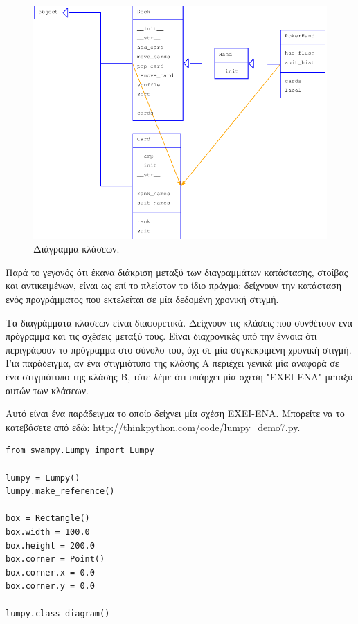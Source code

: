 \documentclass[10pt]{book}
\begin{document}
\begin{figure}
\centerline
{\includegraphics[scale=0.7]{figs/lumpydemo8.pdf}}
\caption{Διάγραμμα κλάσεων.}
\label{fig.lumpy8}
\end{figure}

Παρά το γεγονός ότι έκανα διάκριση μεταξύ των διαγραμμάτων κατάστασης, στοίβας και αντικειμένων, είναι
ως επί το πλείστον το ίδιο πράγμα: δείχνουν την κατάσταση ενός προγράμματος που εκτελείται σε μία δεδομένη
χρονική στιγμή.

Τα διαγράμματα κλάσεων είναι διαφορετικά.  Δείχνουν τις κλάσεις που συνθέτουν ένα πρόγραμμα και τις σχέσεις
μεταξύ τους.  Είναι διαχρονικές υπό την έννοια ότι περιγράφουν το πρόγραμμα στο σύνολο του, όχι σε μία
συγκεκριμένη χρονική στιγμή.  Για παράδειγμα, αν ένα στιγμιότυπο της κλάσης Α περιέχει γενικά μία αναφορά
σε ένα στιγμιότυπο της κλάσης Β, τότε λέμε ότι υπάρχει μία σχέση "ΕΧΕΙ-ΕΝΑ" μεταξύ αυτών των κλάσεων.

Αυτό είναι ένα παράδειγμα το οποίο δείχνει μία σχέση ΕΧΕΙ-ΕΝΑ.  Μπορείτε να το κατεβάσετε από εδώ:
\url{http://thinkpython.com/code/lumpy_demo7.py}.

\begin{verbatim}
from swampy.Lumpy import Lumpy

lumpy = Lumpy()
lumpy.make_reference()

box = Rectangle()
box.width = 100.0
box.height = 200.0
box.corner = Point()
box.corner.x = 0.0
box.corner.y = 0.0

lumpy.class_diagram()
\end{verbatim}
\end{document}
